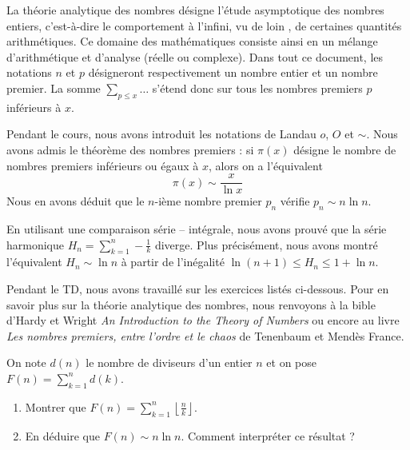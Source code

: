 La théorie analytique des nombres désigne l'étude asymptotique des nombres entiers, c'est-à-dire le comportement à l'infini, \og vu de loin \fg, de certaines quantités arithmétiques. Ce domaine des mathématiques consiste ainsi en un mélange d'arithmétique et d'analyse (réelle ou complexe). Dans tout ce document, les notations $n$ et $p$ désigneront respectivement un nombre entier et un nombre premier. La somme $\sum_{p \le x} \dots$ s'étend donc sur tous les nombres premiers $p$ inférieurs à $x$.

Pendant le cours, nous avons introduit les notations de Landau $o$, $O$ et $\sim$. Nous avons admis le théorème des nombres premiers : si $\pi(x)$ désigne le nombre de nombres premiers inférieurs ou égaux à $x$, alors on a l'équivalent
$$\pi(x) \sim \frac x{\ln x}$$
Nous en avons déduit que le $n$-ième nombre premier $p_n$ vérifie $p_n \sim n \ln n$.

En utilisant une comparaison série -- intégrale, nous avons prouvé que la série harmonique $H_n = \sum_{k = 1}^n - \frac 1{k}$ diverge. Plus précisément, nous avons montré l'équivalent $H_n \sim \ln n$ à partir de l'inégalité $\ln(n+1) \le H_n \le 1 + \ln n $.

Pendant le TD, nous avons travaillé sur les exercices listés ci-dessous. Pour en savoir plus sur la théorie analytique des nombres, nous renvoyons à la bible d'Hardy et Wright \textit{An Introduction to the Theory of Numbers} ou encore au livre \textit{Les nombres premiers, entre l'ordre et le chaos} de Tenenbaum et Mendès France.


\begin{exo}
On note $d(n)$ le nombre de diviseurs d'un entier $n$ et on pose $F(n) = \displaystyle\sum_{k = 1}^n d(k)$.
\begin{enumerate}
\item Montrer que $F(n) = \displaystyle\sum_{k = 1}^n \left\lfloor \frac{n}{k} \right\rfloor$.
\item En déduire que $F(n) \sim n \ln n$. Comment interpréter ce résultat ?
\end{enumerate}
\end{exo}


